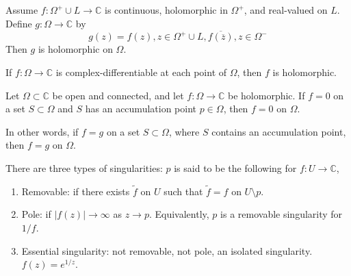 \documentclass[openany]{book}
\newcommand{\C}{\mathbb{C}}
\begin{document}
\begin{prop}
    Assume $f:\Omega^+\cup L\to\C$ is continuous, holomorphic in $\Omega^+$, and real-valued on $L$. Define $g:\Omega\to\C$ by
    \begin{equation*}
        g(z)=f(z), z\in\Omega^+\cup L, \overline{f(\overline{z})}, z\in\Omega^-
    \end{equation*}
    Then $g$ is holomorphic on $\Omega$.
\end{prop}


\begin{prop}
    If $f:\Omega\to\C$ is complex-differentiable at each point of $\Omega$, then $f$ is holomorphic.
\end{prop}



\begin{prop}
    Let $\Omega \subset \mathbb{C}$ be open and connected, and let $f : \Omega \to \mathbb{C}$ be holomorphic. If $f = 0$ on a set $S \subset \Omega$ and $S$ has an accumulation point $p \in \Omega$, then $f = 0$ on $\Omega$.

    In other words, if $f=g$ on a set $S\subset\Omega$, where $S$ contains an accumulation point, then $f=g$ on $\Omega$.
\end{prop}





\begin{defn}[singularities]
    There are three types of singularities: $p$ is said to be the following for $f:U\to\C$,
    \begin{enumerate}
        \item Removable: if there exists $\tilde{f}$ on $U$ such that $\tilde{f}=f$ on $U\setminus p$.
        \item Pole: if $|f(z)|\to\infty$ as $z\to p$. Equivalently, $p$ is a removable singularity for $1/f$.
        \item Essential singularity: not removable, not pole, an isolated singularity. $f(z)=e^{1/z}$.
    \end{enumerate}
\end{defn}
\end{document}
